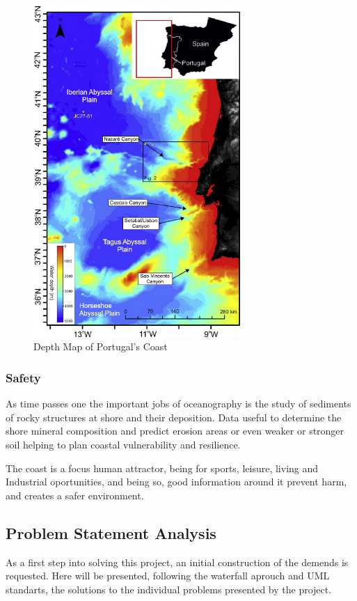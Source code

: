 \begin{figure}[H]
    \centering
    \includegraphics[angle=90,origin=c,width=0.7\textwidth]{images/maps/pt_depth.png}  %
    \vspace{-2.2cm}
    \caption{Depth Map of Portugal's Coast}
    \label{fig:Depth Map of Portugal's Coast}        
\end{figure}


\subsubsection{Safety}
As time passes one the important jobs of oceanography is the study of sediments of rocky
structures at shore and their deposition. Data useful to determine the shore mineral composition
and predict erosion areas or even weaker or stronger soil helping to plan coastal vulnerability and resilience.

The coast is a focus human attractor, being for sports, leisure, living and Industrial oportunities, and being so, good information around it
prevent harm, and creates a safer environment.   

\subsection{Problem Statement Analysis}
As a first step into solving this project, an initial construction of the
demends is requested. Here will be presented, following the waterfall aprouch
and UML standarts, the solutions to the individual problems presented by the project.

